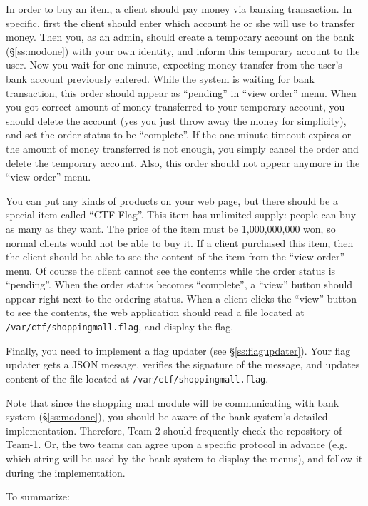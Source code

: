\documentclass[a4paper, 11pt]{article}
\theoremstyle{definition}
\begin{document}
{In order to buy an item, a client should pay money via banking
transaction. In specific, first the client should enter which account
he or she will use to transfer money. Then you, as an admin, should
create a temporary account on the bank (\S\ref{ss:modone}) with your
own identity, and inform this temporary account to the user. Now you
wait for one minute, expecting money transfer from the user's bank
account previously entered.  While the system is waiting for bank
transaction, this order should appear as ``pending'' in ``view order''
menu. When you got correct amount of money transferred to your
temporary account, you should delete the account (yes you just throw
away the money for simplicity), and set the order status to be
``complete''. If the one minute timeout expires or the amount of money
transferred is not enough, you simply cancel the order and delete the
temporary account. Also, this order should not appear anymore in the
``view order'' menu.

You can put any kinds of products on your web page, but there should
be a special item called ``CTF Flag''. This item has unlimited supply:
people can buy as many as they want. The price of the item must be
1,000,000,000 won, so normal clients would not be able to buy it. If a
client purchased this item, then the client should be able to see the
content of the item from the ``view order'' menu. Of course the client
cannot see the contents while the order status is ``pending''. When
the order status becomes ``complete'', a ``view'' button should appear
right next to the ordering status. When a client clicks the ``view''
button to see the contents, the web application should read a file
located at \texttt{/var/ctf/shoppingmall.flag}, and display the flag.

Finally, you need to implement a flag updater (see
\S\ref{ss:flagupdater}). Your flag updater gets a JSON message,
verifies the signature of the message, and updates content of the file
located at \texttt{/var/ctf/shoppingmall.flag}.

Note that since the shopping mall module will be communicating with
bank system (\S\ref{ss:modone}), you should be aware of the bank
system's detailed implementation. Therefore, Team-2 should frequently
check the repository of Team-1. Or, the two teams can agree upon a
specific protocol in advance (e.g. which string will be used by the
bank system to display the menus), and follow it during the
implementation.

To summarize:
\begin{enumerate}


\end{enumerate}}
\end{document}
